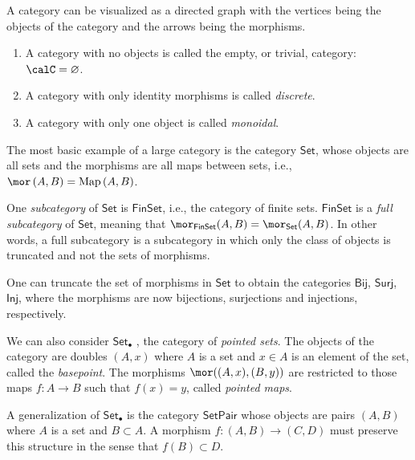 A category can be visualized as a directed graph with the vertices
being the objects of the category and the arrows being the morphisms.
\begin{example}
\begin{enumerate}
    \item A category with no objects is called the empty, or trivial, category: $\calC=\varnothing$.
    \item A category with only identity morphisms is called \emph{discrete}.
    \item A category with only one object is called \emph{monoidal}.
\end{enumerate}
    
\end{example}

\begin{example}
    The most basic example of a large category is the category $\mathsf{Set}$,
    whose objects are all sets and the morphisms are all maps between
    sets, i.e., $\mor\left(A,B\right)=\mathrm{Map}\left(A,B\right)$. 

    One \emph{subcategory} of $\mathsf{Set}$ is $\mathsf{FinSet}$,
    i.e., the category of finite sets. $\mathsf{FinSet}$ is a \emph{full
    subcategory} of $\mathsf{Set}$, meaning that $\mor_{\mathsf{FinSet}}(A,B)=\mor_{\mathsf{Set}}(A,B)$.
    In other words, a full subcategory is a subcategory in which only
    the class of objects is truncated and not the sets of morphisms.
\end{example}
%
\begin{example}
    One can truncate the set of morphisms in $\mathsf{Set}$ to obtain
    the categories $\mathsf{Bij}$, $\mathsf{Surj}$, $\mathsf{Inj}$,
    where the morphisms are now bijections, surjections and injections,
    respectively.
\end{example}
%
\begin{example}
    We can also consider $\mathsf{Set}_{\bullet}$ , the category of \emph{pointed
    sets}. The objects of the category are doubles $(A,x)$ where $A$
    is a set and $x\in A$ is an element of the set, called the \emph{basepoint}.
    The morphisms $\mor((A,x),(B,y))$ are restricted to those maps $f:A\rightarrow B$
    such that $f(x)=y$, called \emph{pointed maps}.
\end{example}
%
\begin{example}
A generalization of $\mathsf{Set}_{\bullet}$ is the category $\mathsf{SetPair}$
whose objects are pairs $(A,B)$ where $A$ is a set and $B\subset A$.
A morphism $f:(A,B)\rightarrow(C,D)$ must preserve this structure
in the sense that $f(B)\subset D$.
\end{example}
